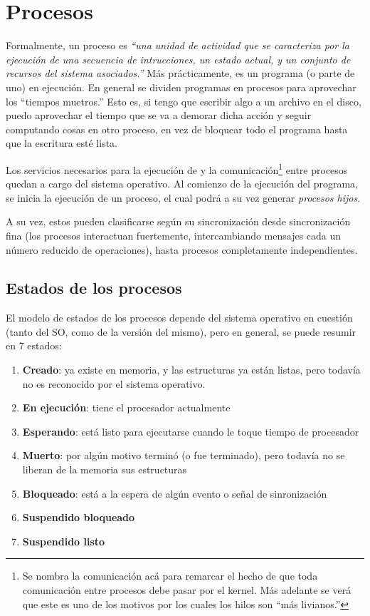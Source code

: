 \section{Procesos}
Formalmente, un proceso es \textit{``una unidad de actividad que se caracteriza por la ejecución de una secuencia de intrucciones, un estado actual, y un conjunto de recursos del sistema asociados.''} Más prácticamente, es un programa (o parte de uno) en ejecución. En general se dividen programas en procesos para aprovechar los ``tiempos muetros.'' Esto es, si tengo que escribir algo a un archivo en el disco, puedo aprovechar el tiempo que se va a demorar dicha acción y seguir computando cosas en otro proceso, en vez de bloquear todo el programa hasta que la escritura esté lista.

Los servicios necesarios para la ejecución de y la comunicación\footnote{Se nombra la comunicación acá para remarcar el hecho de que toda comunicación entre procesos debe pasar por el kernel. Más adelante se verá que este es uno de los motivos por los cuales los hilos son ``más livianos.''} entre procesos quedan a cargo del sistema operativo. Al comienzo de la ejecución del programa, se inicia la ejecución de un proceso, el cual podrá a su vez generar \textit{procesos hijos}.

A su vez, estos pueden clasificarse según su sincronización desde sincronización fina (los procesos interactuan fuertemente, intercambiando mensajes cada un número reducido de operaciones), hasta procesos completamente independientes.

\subsection{Estados de los procesos}
El modelo de estados de los procesos depende del sistema operativo en cuestión (tanto del SO, como de la versión del mismo), pero en general, se puede resumir en 7 estados:
\begin{enumerate}
  \item \textbf{Creado}: ya existe en memoria, y las estructuras ya están listas, pero todavía no es reconocido por el sistema operativo.
  \item \textbf{En ejecución}: tiene el procesador actualmente
  \item \textbf{Esperando}: está listo para ejecutarse cuando le toque tiempo de procesador
  \item \textbf{Muerto}: por algún motivo terminó (o fue terminado), pero todavía no se liberan de la memoria sus estructuras
  \item \textbf{Bloqueado}: está a la espera de algún evento o señal de sinronización
  \item \textbf{Suspendido bloqueado}
  \item \textbf{Suspendido listo}
\end{enumerate}

